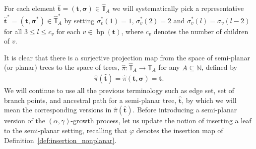 \documentclass[a4paper, final]{amsart}
\theoremstyle{plain}
\theoremstyle{definition}
\newtheorem{defi}[thm]{Definition}
\newcommand{\tree}[1][t]{\boldsymbol{#1}}
\newcommand{\that}[1][t]{\hat{\boldsymbol{#1}}} %
\newcommand{\treesigma}[1][\sigma]{\boldsymbol{#1}}
\newcommand{\Thatspace}[1][\T]{\widehat{\boldsymbol{#1}}} %
\newcommand{\T}{\mathbb{T}}
\DeclareMathOperator{\internal}{int}
\DeclareMathOperator{\branchpoints}{bp}
\DeclareMathOperator{\tildei}{\tilde{\textit{\i}}}
\newcommand{\N}{\mathbb{N}}
\begin{document}
%
For each element $\that = (\tree, \treesigma) \in \Thatspace_A$ we will systematically pick a representative $\that^* = (\tree, \treesigma^*) \in \Thatspace_A^*$ by setting $\sigma_v^*(1) = 1$, $\sigma_v^*(2) = 2$ and $\sigma_v^*(l) = \sigma_v(l-2)$ for all $3 \leq l \leq c_v$ for each $v \in \branchpoints(\tree)$, where $c_v$ denotes the number of children of $v$.

It is clear that there is a surjective projection map from the space of semi-planar (or planar) trees to the space of trees, $\hat{\pi} \colon \Thatspace_A \to \T_A$ for any $A \subseteq \N$, defined by
%
\begin{align}\label{projectionmap}
  \hat{\pi} \left( \hat{\tree} \right) = \hat{\pi} \left( \tree, \treesigma \right) = \tree.
\end{align}
%
We will continue to use all the previous terminology such as edge set, set of branch points, and ancestral path for a semi-planar tree, $\that$, by which we will mean the corresponding versions in $\hat{\pi} ( \that )$. 
%
Before introducing a semi-planar version of the $(\alpha, \gamma)$-growth process, let us update the notion of inserting a leaf to the semi-planar setting, recalling that $\varphi$ denotes the insertion map of Definition~\ref{def:insertion_nonplanar}.
%
\end{document}
